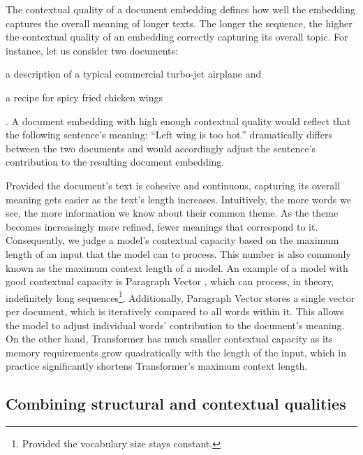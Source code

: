 The contextual quality of a document embedding defines how well the embedding
captures the overall meaning of longer texts. The longer the sequence, the
higher the contextual quality of an embedding correctly
capturing its overall topic. For instance, let us consider two
documents: \begin{enumerate*}
  \item a description of a typical commercial turbo-jet airplane
    and\label{enumitem:plane}
  \item a recipe for spicy fried chicken wings\label{enumitem:chicken}
\end{enumerate*}.
A document embedding with high enough contextual quality would reflect that the
following sentence's meaning: ``Left wing is too hot.'' dramatically differs between
the two documents and would accordingly adjust the sentence's contribution to
the resulting document embedding.

Provided the document's text is cohesive and continuous, capturing its overall
meaning gets easier as the text's length increases. Intuitively, the more words
we see, the more information we know about their common theme. As the theme
becomes increasingly more refined, fewer meanings that correspond to it.
Consequently, we judge a model's contextual capacity based on the maximum
length of an input that the model can to process. This number is also commonly
known as the maximum context length of a model. An example of a model with good
contextual capacity is Paragraph Vector \citep{le2014distributed}, which can
process, in theory, indefinitely long sequences\footnote{Provided the
vocabulary size stays constant.}. Additionally, Paragraph Vector stores a
single vector per document, which is iteratively compared to all words within
it. This allows the model to adjust individual words' contribution to the
document's meaning. On the other hand, Transformer \citep{vaswani2017attention}
has much smaller contextual capacity as its memory requirements grow
quadratically with the length of the input, which in practice significantly
shortens Transformer's maximum context length.

\subsection{Combining structural and contextual
qualities}\label{section:combine_structural_and_contextual}


